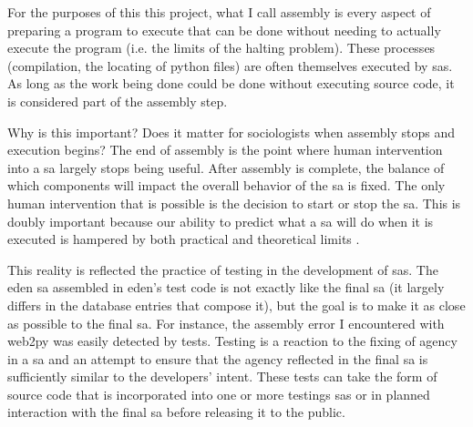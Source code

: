 \documentclass[a4paper,man,natbib,floatsintext]{apa6}
\begin{document}
   For the purposes of this this project, what I call assembly is every aspect of preparing a program to execute that can be done without needing to actually execute the program (i.e. the limits of the halting problem). These processes (compilation, the locating of python files) are often themselves executed by \glspl{sa}. As long as the work being done could be done without executing source code, it is considered part of the assembly step. 

   Why is this important? Does it matter for sociologists when assembly stops and execution begins? The end of assembly is the point where human intervention into a \gls{sa} largely stops being useful. After assembly is complete, the balance of which components will impact the overall behavior of the \gls{sa} is fixed. The only human intervention that is possible is the decision to start or stop the \gls{sa}. This is doubly important because our ability to predict what a \gls{sa} will do when it is executed is hampered by both practical and theoretical limits \citep{Kaplan_undated-xy}. 

   This reality is reflected the practice of testing in the development of \glspl{sa}. The \acrshort{eden} \gls{sa} assembled in \acrshort{eden}'s test code is not exactly like the final \gls{sa} (it largely differs in the database entries that compose it), but the goal is to make it as close as possible to the final \gls{sa}. For instance, the assembly error I encountered with web2py was easily detected by tests. Testing is a reaction to the fixing of agency in a \gls{sa} and an attempt to ensure that the agency reflected in the final \gls{sa} is sufficiently similar to the developers' intent. These tests can take the form of source code that is incorporated into one or more testings \glspl{sa} or in planned interaction with the final \gls{sa} before releasing it to the public. 


\end{document}
